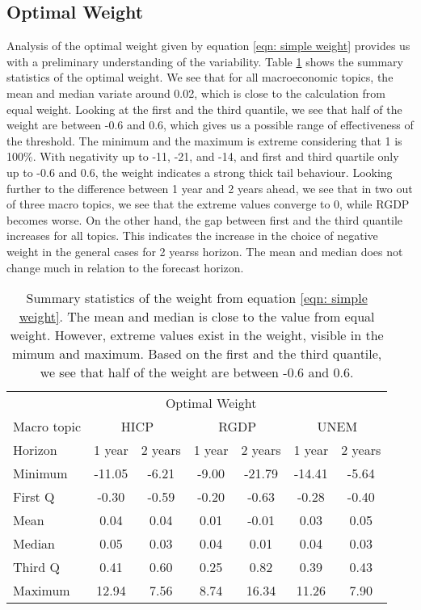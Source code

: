 \documentclass[11pt]{article}
\begin{document}
\subsection{Optimal Weight}\label{optimal-weight}
Analysis of the optimal weight given by equation
\ref{eqn: simple weight} provides us with a preliminary understanding of the
variability. Table \ref{tab: simple weight summary statistics} shows the
summary statistics of the optimal weight. We see that for all macroeconomic
topics, the mean and median variate around 0.02, which is close to the
calculation from equal weight. Looking at the first and the third
quantile, we see that half of the weight are between -0.6 and 0.6,
which gives us a possible range of effectiveness of the threshold. The
minimum and the maximum is extreme considering that 1 is 100\%. With
negativity up to -11, -21, and -14, and first and third quartile only up
to -0.6 and 0.6, the weight indicates a strong thick tail behaviour.
Looking further to the difference between 1 year and 2 years ahead, we
see that in two out of three macro topics, we see that the extreme
values converge to 0, while RGDP becomes worse. On the other hand, the
gap between first and the third quantile increases for all topics. This
indicates the increase in the choice of negative weight in the general
cases for 2 yearss horizon. The mean and median does not change much in
relation to the forecast horizon.

\begin{table}[!h]
	\centering
	\caption{Summary statistics of the weight from equation \ref{eqn: simple weight}. The mean and median is close to the value from equal weight. However, extreme values exist in the weight, visible in the mimum and maximum. Based on the first and the third quantile, we see that half of the weight are between -0.6 and 0.6.}
	\label{tab: simple weight summary statistics}
	\begin{tabular}{lcccccc}%
		\hline
		&\multicolumn{5}{c}{Optimal Weight}\\
		\cmidrule(lr){2-7}
		Macro topic & \multicolumn{2}{c}{HICP} & \multicolumn{2}{c}{RGDP} & \multicolumn{2}{c}{UNEM} \\
		\cmidrule(lr){2-3} \cmidrule(lr){4-5}\cmidrule(lr){6-7}
		Horizon     & 1 year & 2 years & 1 year & 2 years & 1 year & 2 years \\ 
		\hline
		Minimum      & -11.05      & -6.21      & -9.00      & -21.79      & -14.41      & -5.64      \\
		First Q      & -0.30       & -0.59      & -0.20      & -0.63       & -0.28       & -0.40      \\
		Mean         & 0.04        & 0.04       & 0.01       & -0.01       & 0.03        & 0.05       \\
		Median       & 0.05        & 0.03       & 0.04       & 0.01        & 0.04        & 0.03       \\
		Third Q      & 0.41        & 0.60       & 0.25       & 0.82        & 0.39        & 0.43       \\
		Maximum      & 12.94       & 7.56       & 8.74       & 16.34       & 11.26       & 7.90       \\ 
		\hline
	\end{tabular}
\end{table}
\end{document}
